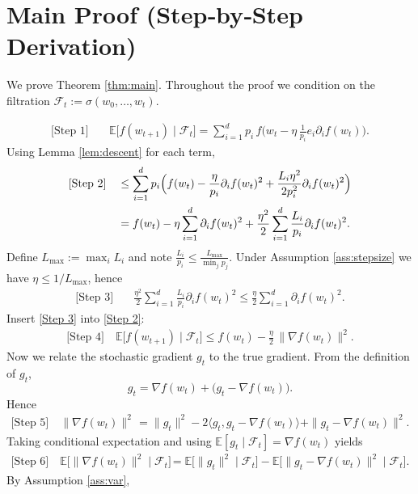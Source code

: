 \documentclass[11pt]{article}
\newcommand{\E}{\mathbb{E}}
\newcommand{\ip}[2]{\langle #1,#2\rangle}
\newcommand{\grad}{\nabla}
\begin{document}
\section*{Main Proof (Step‑by‑Step Derivation)}
We prove Theorem \ref{thm:main}. Throughout the proof we condition on the filtration $\mathcal{F}_t:=\sigma(w_0,\dots,w_t)$.

\begin{align}
\text{[Step 1]} \quad 
&\E\!\bigl[f(w_{t+1})\mid\mathcal{F}_t\bigr]
 = \sum_{i=1}^{d}p_i\,
    f\!\bigl(w_t-\eta\,\tfrac{1}{p_i}e_i\partial_i f(w_t)\bigr) .
\end{align}
Using Lemma \ref{lem:descent} for each term,
\begin{align}
\text{[Step 2]} \quad 
&\le \sum_{i=1}^{d}p_i\Bigl(
      f(w_t)-\frac{\eta}{p_i}\partial_i f(w_t)^{2}
      +\frac{L_i\eta^{2}}{2p_i^{2}}\partial_i f(w_t)^{2}
      \Bigr) \nonumber\\
&= f(w_t)-\eta\sum_{i=1}^{d}\partial_i f(w_t)^{2}
   +\frac{\eta^{2}}{2}\sum_{i=1}^{d}\frac{L_i}{p_i}\partial_i f(w_t)^{2}.
\end{align}
Define $L_{\max}:=\max_i L_i$ and note $\frac{L_i}{p_i}\le \frac{L_{\max}}{\min_j p_j}$.
Under Assumption \ref{ass:stepsize} we have $\eta\le 1/L_{\max}$, hence
\begin{align}
\text{[Step 3]} \quad 
&\frac{\eta^{2}}{2}\sum_{i=1}^{d}\frac{L_i}{p_i}\partial_i f(w_t)^{2}
 \le \frac{\eta}{2}\sum_{i=1}^{d}\partial_i f(w_t)^{2}.
\end{align}
Insert \eqref{Step 3} into \eqref{Step 2}:
\begin{align}
\text{[Step 4]} \quad 
\E\!\bigl[f(w_{t+1})\mid\mathcal{F}_t\bigr]
\le f(w_t)-\frac{\eta}{2}\,\|\grad f(w_t)\|^{2}.
\end{align}
Now we relate the stochastic gradient $g_t$ to the true gradient.
From the definition of $g_t$,
\[
g_t = \grad f(w_t)+\bigl(g_t-\grad f(w_t)\bigr).
\]
Hence
\begin{align}
\text{[Step 5]} \quad 
\|\grad f(w_t)\|^{2}
&= \|g_t\|^{2}
   -2\ip{g_t}{g_t-\grad f(w_t)}
   +\|g_t-\grad f(w_t)\|^{2}.
\end{align}
Taking conditional expectation and using $\E[g_t\mid\mathcal{F}_t]=\grad f(w_t)$ yields
\begin{align}
\text{[Step 6]} \quad 
\E\!\bigl[\|\grad f(w_t)\|^{2}\mid\mathcal{F}_t\bigr]
&= \E\!\bigl[\|g_t\|^{2}\mid\mathcal{F}_t\bigr]
   -\E\!\bigl[\|g_t-\grad f(w_t)\|^{2}\mid\mathcal{F}_t\bigr].
\end{align}
By Assumption \ref{ass:var},
\end{document}

